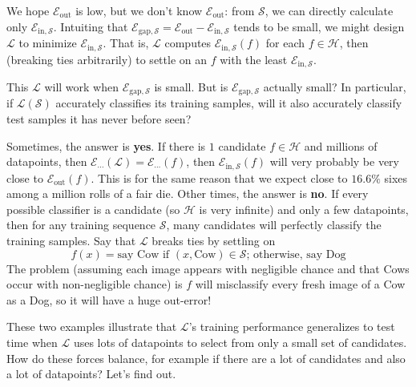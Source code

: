 \documentclass{article}
\newcommand{\Ee}{\mathcal{E}}
\newcommand{\Hh}{\mathcal{H}}
\newcommand{\Ll}{\mathcal{L}}
\newcommand{\Ss}{\mathcal{S}}
\begin{document}
            We hope $\Ee_{\text{out}}$ is low, but we don't know
            $\Ee_{\text{out}}$: from $\Ss$, we can directly calculate only
            $\Ee_{\text{in},\Ss}$.  Intuiting that
            $ 
                \Ee_{\text{gap},\Ss} = \Ee_{\text{out}} - \Ee_{\text{in},\Ss}
            $ 
            tends to be small, we might design $\Ll$ to minimize $\Ee_{\text{in},\Ss}$.
            That is, $\Ll$ computes $\Ee_{\text{in},\Ss}(f)$ for
            each $f\in \Hh$, then (breaking ties arbitrarily) to settle on an
            $f$ with the least $\Ee_{\text{in},\Ss}$.
            
            This $\Ll$ will work when $\Ee_{\text{gap},\Ss}$ is small.
            But is $\Ee_{\text{gap},\Ss}$ actually small?  In particular, if
            $\Ll(\Ss)$ accurately classifies its training samples, will it also
            accurately classify test samples it has never before seen?

            Sometimes, the answer is \textbf{yes}.
                If there is $1$ candidate $f\in \Hh$ and millions of
                datapoints, then $\Ee_{\cdots}(\Ll) = \Ee_{\cdots}(f)$, then
                $\Ee_{\text{in},\Ss}(f)$ will very probably be very close to
                $\Ee_{\text{out}}(f)$.  This is for the same reason that we
                expect close to $16.6\%$ sixes among a million rolls of a fair
                die. 
            Other times, the answer is \textbf{no}.
                If every possible classifier is a candidate (so $\Hh$ is very
                infinite) and only a few datapoints, then for any training
                sequence $\Ss$, many candidates will perfectly classify the
                training samples.  Say that $\Ll$ breaks ties 
                by settling on
                $$
                    f(x) = \text{say Cow if $(x,\text{Cow}) \in \Ss$;
                            otherwise, say Dog}
                $$
                The problem (assuming each image appears with negligible chance
                and that Cows occur with non-negligible chance) is $f$ will
                misclassify every fresh image of a Cow as a Dog, so it will
                have a huge out-error!

            These two examples illustrate that $\Ll$'s training performance
            generalizes to test time when $\Ll$ uses lots of datapoints to
            select from only a small set of candidates.  
            How do these forces balance, for example if there are a lot of
            candidates and also a lot of datapoints?  Let's find out.
\end{document}
